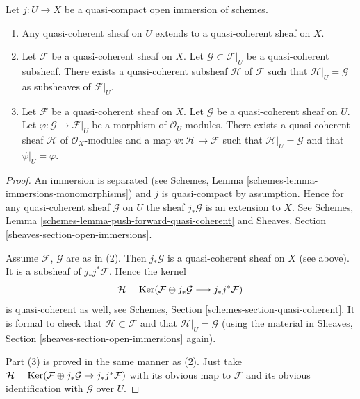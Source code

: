 \begin{lemma}
\label{lemma-extend-trivial}
Let $j : U \to X$ be a quasi-compact open immersion of schemes.
\begin{enumerate}
\item Any quasi-coherent sheaf on $U$ extends to a quasi-coherent
sheaf on $X$.
\item Let $\mathcal{F}$ be a quasi-coherent sheaf on $X$.
Let $\mathcal{G} \subset \mathcal{F}|_U$ be a quasi-coherent
subsheaf. There exists a quasi-coherent subsheaf $\mathcal{H}$ of
$\mathcal{F}$ such that $\mathcal{H}|_U = \mathcal{G}$
as subsheaves of $\mathcal{F}|_U$.
\item Let $\mathcal{F}$ be a quasi-coherent sheaf on $X$.
Let $\mathcal{G}$ be a quasi-coherent sheaf on $U$.
Let $\varphi : \mathcal{G} \to \mathcal{F}|_U$ be a morphism
of $\mathcal{O}_U$-modules. There exists a quasi-coherent sheaf $\mathcal{H}$
of $\mathcal{O}_X$-modules and a map $\psi : \mathcal{H} \to \mathcal{F}$
such that $\mathcal{H}|_U = \mathcal{G}$ and that
$\psi|_U = \varphi$.
\end{enumerate}
\end{lemma}

\begin{proof}
An immersion is separated
(see Schemes, Lemma \ref{schemes-lemma-immersions-monomorphisms})
and $j$ is quasi-compact by assumption.
Hence for any quasi-coherent sheaf $\mathcal{G}$ on $U$ the sheaf
$j_*\mathcal{G}$ is an extension to $X$. See
Schemes, Lemma \ref{schemes-lemma-push-forward-quasi-coherent} and
Sheaves, Section \ref{sheaves-section-open-immersions}.

\medskip\noindent
Assume $\mathcal{F}$, $\mathcal{G}$ are as in (2).
Then $j_*\mathcal{G}$ is a quasi-coherent sheaf on $X$ (see above).
It is a subsheaf of $j_*j^*\mathcal{F}$.
Hence the kernel
$$
\mathcal{H} =
\mathop{\mathrm{Ker}}(\mathcal{F} \oplus j_* \mathcal{G}
\longrightarrow j_*j^*\mathcal{F})
$$
is quasi-coherent as well, see
Schemes, Section \ref{schemes-section-quasi-coherent}.
It is formal to check that $\mathcal{H} \subset \mathcal{F}$ and that
$\mathcal{H}|_U = \mathcal{G}$ (using the material in
Sheaves, Section \ref{sheaves-section-open-immersions} again).

\medskip\noindent
Part (3) is proved in the same manner as (2). Just take
$\mathcal{H} = \mathop{\mathrm{Ker}}(\mathcal{F} \oplus j_* \mathcal{G}
\to j_*j^*\mathcal{F})$ with its obvious map to $\mathcal{F}$
and its obvious identification with $\mathcal{G}$ over $U$.
\end{proof}

